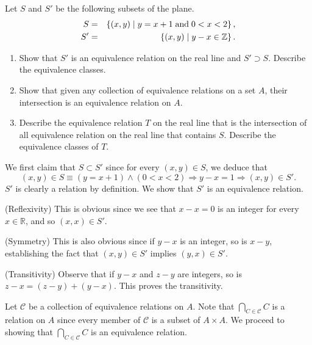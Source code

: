 \documentclass[a4paper,12pt]{article}
\begin{document}
\begin{exe}
	Let \( S \)  and \( S' \) be the following subsets of the plane.
	\begin{eqnarray*}
		S&=&\left\{ (x,y)  \;|\; y=x+1 \;\text{and}\; 0<x<2\right\},\\
		S'&=&\left\{ (x,y)  \;|\; y-x \in \mathbb{Z}\right\}.
	\end{eqnarray*}
	\begin{enumerate}
		\item
		      Show that \( S' \) is an equivalence relation on the real line and \( S' \supset S \).
		      Describe the equivalence classes.
		      
		\item
		      Show that given any collection of equivalence relations on a set \( A \),
		      their intersection is an equivalence relation on \( A \).
		      
		\item
		      Describe the equivalence relation \( T \) on the real line
		      that is the intersection of all equivalence relation on the real line that contains \( S \).
		      Describe the equivalence classes of \( T \).
	\end{enumerate}
\end{exe}\begin{sol}\leavevmode \par
	We first claim that 
	\( S \subset S' \)
	since for every \( (x,y) \in S\),
	we deduce that
	\begin{equation*}
		(x,y) \in S
		\equiv
		(y=x+1)
		\wedge
		(0<x<2)
		\Rightarrow
		y-x=1
		\Rightarrow
		(x,y)\in S'.
	\end{equation*}
	\( S' \) is clearly a relation by definition.
	We show that \( S' \) is an equivalence relation.
	
	(Reflexivity)
	This is obvious since
	we see that \( x- x =0 \) is an integer 
	for every \( x \in \mathbb{R} \),
	and so \( (x,x) \in S' \).
	
	(Symmetry)
	This is also obvious since 
	if \( y-x \) is an integer, so is \( x-y \),
	establishing the fact that 
	\( (x,y)\in S' \)
	implies 
	\( (y,x)\in S'\).
	
	(Transitivity)
	Observe that
	if \( y-x \) and \( z-y \) are integers,
	so is \( z-x = (z-y) + (y-x)\).
	This proves the transitivity.
	
	Let \( \mathcal{C} \) be a collection of equivalence relations on \( A \).
	Note that
	\( \bigcap_{C \in \mathcal{C}}C \)
	is a relation on \( A \)
	since every member of \( \mathcal{C} \) is a subset of \( A \times A \).
	We proceed to showing that
	\( \bigcap_{C \in \mathcal{C}}C \)
	is an equivalence relation.
	

\end{sol}
\end{document}
